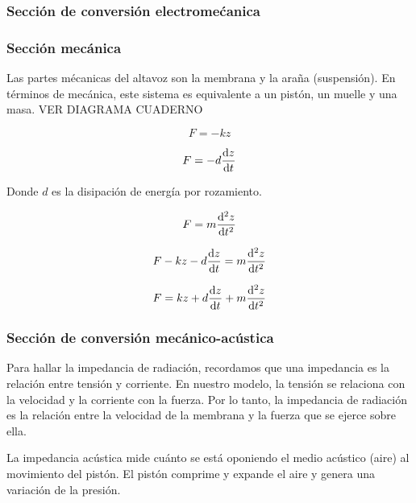 \documentclass[12pt, a4paper]{article}
\begin{document}
\subsubsection{Sección de conversión electromećanica}

\subsubsection{Sección mecánica}

Las partes mécanicas del altavoz son la membrana y la araña (suspensión). En términos de mecánica, este sistema es equivalente a un pistón, un muelle y una masa. VER DIAGRAMA CUADERNO

\begin{equation} \label{eq:ley_hooke}
    F = -kz
\end{equation}

\begin{equation} \label{eq:amortiguamiento}
    F = -d \dv{z}{t}
\end{equation}

Donde $d$ es la disipación de energía por rozamiento.

\begin{equation} \label{eq:masa}
    F = m \dv[2]{z}{t}
\end{equation}

\begin{equation} \label{eq:ecuacion_seccion_mecanica}
    F - k z - d \dv{z}{t} = m \dv[2]{z}{t}
\end{equation}

\begin{equation} \label{eq:ecuacion_seccion_mecanica_2}
    F = kz + d \dv{z}{t} + m \dv[2]{z}{t}
\end{equation}

\subsubsection{Sección de conversión mecánico-acústica}

Para hallar la impedancia de radiación, recordamos que una impedancia es la relación entre tensión y corriente. En nuestro modelo, la tensión se relaciona con la velocidad y la corriente con la fuerza. Por lo tanto, la impedancia de radiación es la relación entre la velocidad de la membrana y la fuerza que se ejerce sobre ella.

La impedancia acústica mide cuánto se está oponiendo el medio acústico (aire) al movimiento del pistón. El pistón comprime y expande el aire y genera una variación de la presión.
\end{document}

